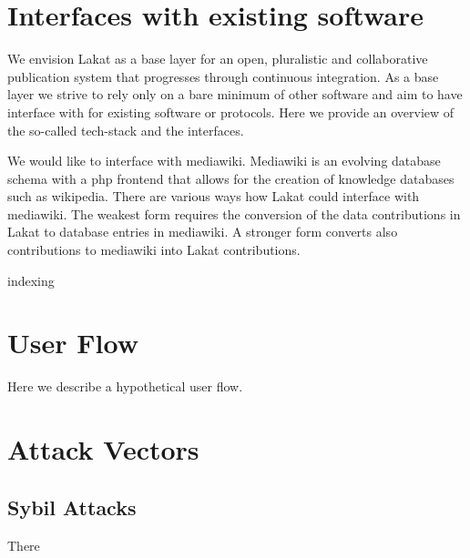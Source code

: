 \documentclass[14pt]{article}
\newcommand{\remark}[1]{{\color{purple} (#1)}}
\begin{document}
\section{Interfaces with existing software}

We envision Lakat as a base layer for an open, pluralistic and collaborative publication system that progresses through continuous integration. As a base layer we strive to rely only on a bare minimum of other software and aim to have interface with for existing software or protocols. Here we provide an overview of the so-called tech-stack and the interfaces. 

We would like to interface with mediawiki. Mediawiki is an evolving database schema with a php frontend that allows for the creation of knowledge databases such as wikipedia. There are various ways how Lakat could interface with mediawiki. The weakest form requires the conversion of the data contributions in Lakat to database entries in mediawiki. A stronger form converts also contributions to mediawiki into Lakat contributions.

indexing

\section{User Flow}
Here we describe a hypothetical user flow. 


\section{Attack Vectors}

\subsection{Sybil Attacks}
There 




% 
% 
\end{document}
